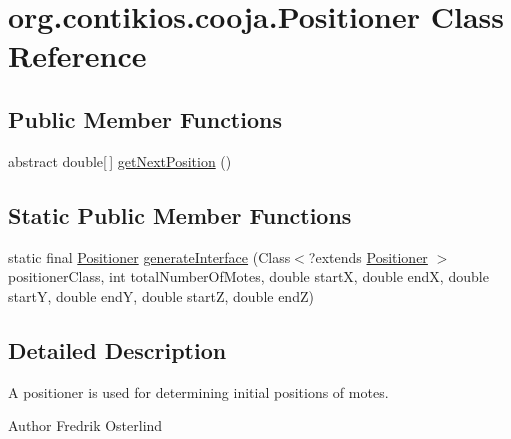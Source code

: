 \hypertarget{classorg_1_1contikios_1_1cooja_1_1Positioner}{\section{org.\-contikios.\-cooja.\-Positioner Class Reference}
\label{classorg_1_1contikios_1_1cooja_1_1Positioner}
}
\subsection*{Public Member Functions}
\begin{DoxyCompactItemize}
\item 
abstract double\mbox{[}$\,$\mbox{]} \hyperlink{classorg_1_1contikios_1_1cooja_1_1Positioner_a25070e5a0ec8d7a8d352e2db4c5c3902}{get\-Next\-Position} ()
\end{DoxyCompactItemize}
\subsection*{Static Public Member Functions}
\begin{DoxyCompactItemize}
\item 
static final \hyperlink{classorg_1_1contikios_1_1cooja_1_1Positioner}{Positioner} \hyperlink{classorg_1_1contikios_1_1cooja_1_1Positioner_af8c1ec799205545722307e3126098325}{generate\-Interface} (Class$<$?extends \hyperlink{classorg_1_1contikios_1_1cooja_1_1Positioner}{Positioner} $>$ positioner\-Class, int total\-Number\-Of\-Motes, double start\-X, double end\-X, double start\-Y, double end\-Y, double start\-Z, double end\-Z)
\end{DoxyCompactItemize}


\subsection{Detailed Description}
A positioner is used for determining initial positions of motes.

\begin{DoxyAuthor}{Author}
Fredrik Osterlind 
\end{DoxyAuthor}


